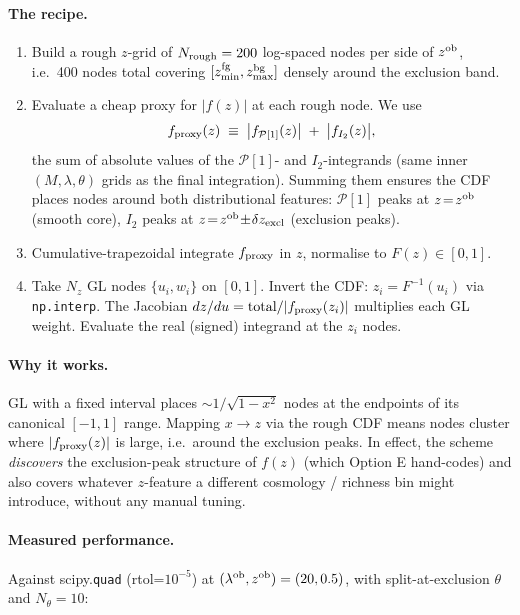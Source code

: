 \documentclass[11pt]{article}
\newcommand{\lob}{\lambda^{\rm ob}}
\newcommand{\zob}{z^{\rm ob}}
\newcommand{\Pop}{\mathcal{P}}
\begin{document}
\paragraph{The recipe.}
\begin{enumerate}
  \item Build a rough \(z\)-grid of
        \(N_{\rm rough}=200\) log-spaced nodes per side of \(\zob\),
        i.e.\ 400 nodes total covering
        \([z^{\rm fg}_{\min},z^{\rm bg}_{\max}]\) densely around the
        exclusion band.
  \item Evaluate a cheap proxy for \(|f(z)|\) at each rough node.
        We use
        \[
        f_{\rm proxy}(z) \;\equiv\;
        \bigl|f_{\Pop[1]}(z)\bigr| \;+\;
        \bigl|f_{I_2}(z)\bigr|,
        \]
        the sum of absolute values of the
        \(\Pop[1]\)- and \(I_2\)-integrands (same inner \((M,\lambda,\theta)\)
        grids as the final integration). Summing them ensures the
        CDF places nodes around both distributional features:
        \(\Pop[1]\) peaks at \(z\!=\!\zob\) (smooth core),
        \(I_2\) peaks at
        \(z\!=\!\zob\!\pm\!\delta z_{\rm excl}\) (exclusion peaks).
  \item Cumulative-trapezoidal integrate \(f_{\rm proxy}\) in \(z\),
        normalise to
        \(F(z)\in[0,1]\).
  \item Take \(N_z\) GL nodes \(\{u_i,w_i\}\) on \([0,1]\). Invert
        the CDF:
        \(z_i=F^{-1}(u_i)\) via \texttt{np.interp}. The Jacobian
        \(dz/du=\text{total}/|f_{\rm proxy}(z_i)|\) multiplies each
        GL weight. Evaluate the real (signed) integrand at the
        \(z_i\) nodes.
\end{enumerate}

\paragraph{Why it works.}
GL with a fixed interval places \(\sim 1/\sqrt{1-x^2}\) nodes at
the endpoints of its canonical \([-1,1]\) range. Mapping
\(x\to z\) via the rough CDF means nodes cluster where
\(|f_{\rm proxy}(z)|\) is large, i.e.\ around the exclusion peaks.
In effect, the scheme \emph{discovers} the exclusion-peak structure
of \(f(z)\) (which Option E hand-codes) and also covers whatever
\(z\)-feature a different cosmology / richness bin might introduce,
without any manual tuning.

\paragraph{Measured performance.}
Against scipy.\texttt{quad} (rtol=\(10^{-5}\)) at
\((\lob,\zob)=(20,0.5)\), with split-at-exclusion \(\theta\)
and \(N_\theta=10\):
\end{document}
